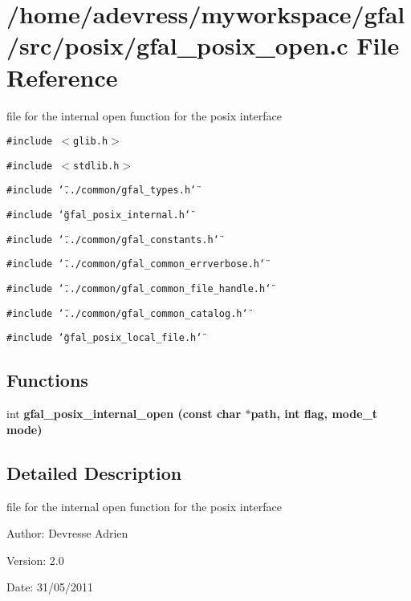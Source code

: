 \section{/home/adevress/myworkspace/gfal/src/posix/gfal\_\-posix\_\-open.c File Reference}
\label{gfal__posix__open_8c}
file for the internal open function for the posix interface 

{\tt \#include $<$glib.h$>$}\par
{\tt \#include $<$stdlib.h$>$}\par
{\tt \#include \char`\"{}../common/gfal\_\-types.h\char`\"{}}\par
{\tt \#include \char`\"{}gfal\_\-posix\_\-internal.h\char`\"{}}\par
{\tt \#include \char`\"{}../common/gfal\_\-constants.h\char`\"{}}\par
{\tt \#include \char`\"{}../common/gfal\_\-common\_\-errverbose.h\char`\"{}}\par
{\tt \#include \char`\"{}../common/gfal\_\-common\_\-file\_\-handle.h\char`\"{}}\par
{\tt \#include \char`\"{}../common/gfal\_\-common\_\-catalog.h\char`\"{}}\par
{\tt \#include \char`\"{}gfal\_\-posix\_\-local\_\-file.h\char`\"{}}\par
\subsection*{Functions}
\begin{CompactItemize}
\item 
int \bf{gfal\_\-posix\_\-internal\_\-open} (const char $\ast$path, int flag, mode\_\-t mode)
\end{CompactItemize}


\subsection{Detailed Description}
file for the internal open function for the posix interface 

\begin{Desc}
\item[Author:]Devresse Adrien \end{Desc}
\begin{Desc}
\item[Version:]2.0 \end{Desc}
\begin{Desc}
\item[Date:]31/05/2011 \end{Desc}


